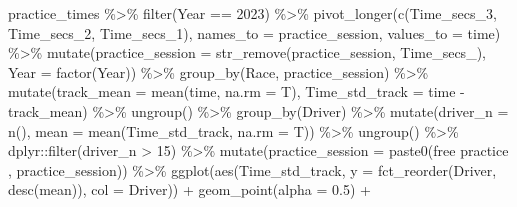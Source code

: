 \documentclass[
]{book}
\newenvironment{Shaded}{\begin{snugshade}}{\end{snugshade}}
\newcommand{\AttributeTok}[1]{\textcolor[rgb]{0.77,0.63,0.00}{#1}}
\newcommand{\DecValTok}[1]{\textcolor[rgb]{0.00,0.00,0.81}{#1}}
\newcommand{\FloatTok}[1]{\textcolor[rgb]{0.00,0.00,0.81}{#1}}
\newcommand{\FunctionTok}[1]{\textcolor[rgb]{0.00,0.00,0.00}{#1}}
\newcommand{\NormalTok}[1]{#1}
\newcommand{\SpecialCharTok}[1]{\textcolor[rgb]{0.00,0.00,0.00}{#1}}
\newcommand{\StringTok}[1]{\textcolor[rgb]{0.31,0.60,0.02}{#1}}
\begin{document}
\begin{Shaded}
\begin{Highlighting}[]
\NormalTok{practice\_times }\SpecialCharTok{\%\textgreater{}\%}
  \FunctionTok{filter}\NormalTok{(Year }\SpecialCharTok{==} \DecValTok{2023}\NormalTok{) }\SpecialCharTok{\%\textgreater{}\%} 
  \FunctionTok{pivot\_longer}\NormalTok{(}\FunctionTok{c}\NormalTok{(Time\_secs\_3, Time\_secs\_2, Time\_secs\_1), }\AttributeTok{names\_to =} \StringTok{\textquotesingle{}practice\_session\textquotesingle{}}\NormalTok{, }\AttributeTok{values\_to =} \StringTok{\textquotesingle{}time\textquotesingle{}}\NormalTok{) }\SpecialCharTok{\%\textgreater{}\%}
  \FunctionTok{mutate}\NormalTok{(}\AttributeTok{practice\_session =} \FunctionTok{str\_remove}\NormalTok{(practice\_session, }\StringTok{\textquotesingle{}Time\_secs\_\textquotesingle{}}\NormalTok{),}
         \AttributeTok{Year =} \FunctionTok{factor}\NormalTok{(Year)) }\SpecialCharTok{\%\textgreater{}\%}
   \FunctionTok{group\_by}\NormalTok{(Race, practice\_session) }\SpecialCharTok{\%\textgreater{}\%}
   \FunctionTok{mutate}\NormalTok{(}\AttributeTok{track\_mean =} \FunctionTok{mean}\NormalTok{(time, }\AttributeTok{na.rm =}\NormalTok{ T),}
          \AttributeTok{Time\_std\_track =}\NormalTok{ time }\SpecialCharTok{{-}}\NormalTok{ track\_mean) }\SpecialCharTok{\%\textgreater{}\%} 
   \FunctionTok{ungroup}\NormalTok{() }\SpecialCharTok{\%\textgreater{}\%} 
   \FunctionTok{group\_by}\NormalTok{(Driver) }\SpecialCharTok{\%\textgreater{}\%} 
   \FunctionTok{mutate}\NormalTok{(}\AttributeTok{driver\_n =} \FunctionTok{n}\NormalTok{(),}
          \AttributeTok{mean =} \FunctionTok{mean}\NormalTok{(Time\_std\_track, }\AttributeTok{na.rm =}\NormalTok{ T)) }\SpecialCharTok{\%\textgreater{}\%}
   \FunctionTok{ungroup}\NormalTok{() }\SpecialCharTok{\%\textgreater{}\%}
\NormalTok{   dplyr}\SpecialCharTok{::}\FunctionTok{filter}\NormalTok{(driver\_n }\SpecialCharTok{\textgreater{}} \DecValTok{15}\NormalTok{) }\SpecialCharTok{\%\textgreater{}\%} 
  \FunctionTok{mutate}\NormalTok{(}\AttributeTok{practice\_session =} \FunctionTok{paste0}\NormalTok{(}\StringTok{\textquotesingle{}free practice \textquotesingle{}}\NormalTok{, practice\_session)) }\SpecialCharTok{\%\textgreater{}\%}  
   \FunctionTok{ggplot}\NormalTok{(}\FunctionTok{aes}\NormalTok{(Time\_std\_track, }\AttributeTok{y =} \FunctionTok{fct\_reorder}\NormalTok{(Driver, }\FunctionTok{desc}\NormalTok{(mean)), }\AttributeTok{col =}\NormalTok{ Driver)) }\SpecialCharTok{+}
   \FunctionTok{geom\_point}\NormalTok{(}\AttributeTok{alpha =} \FloatTok{0.5}\NormalTok{) }\SpecialCharTok{+}

\end{Highlighting}
\end{Shaded}
\end{document}
